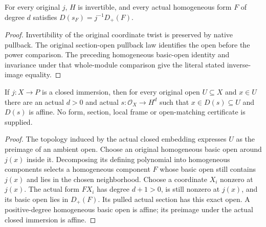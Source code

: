 \begin{lemma}
\label{lem:proj-affine-pulled-section-open}
\leanok
For every original $j$, $H$ is invertible, and every actual homogeneous
form $F$ of degree $d$ satisfies $D(s_F)=j^{-1}D_+(F)$.
\end{lemma}
\begin{proof}
Invertibility of the original coordinate twist is preserved by native
pullback. The original section-open pullback law identifies the open
before the power comparison. The preceding homogeneous basic-open
identity and invariance under that whole-module comparison give the
literal stated inverse-image equality.
\end{proof}

\begin{lemma}
\label{lem:proj-affine-positive-section-neighborhood}
\leanok
If $j:X\to P$ is a closed immersion, then for every original open
$U\subseteq X$ and $x\in U$ there are an actual $d>0$ and actual
$s:\mathcal O_X\to H^d$ such that $x\in D(s)\subseteq U$ and
$D(s)$ is affine. No form, section, local frame or open-matching
certificate is supplied.
\end{lemma}
\begin{proof}
The topology induced by the actual closed embedding expresses $U$ as
the preimage of an ambient open. Choose an original homogeneous basic
open around $j(x)$ inside it. Decomposing its defining polynomial
into homogeneous components selects a homogeneous component $F$ whose
basic open still contains $j(x)$ and lies in the chosen neighborhood.
Choose a coordinate $X_i$ nonzero at $j(x)$. The actual form $FX_i$
has degree $d+1>0$, is still nonzero at $j(x)$, and its basic open
lies in $D_+(F)$. Its pulled actual section has this exact open.
A positive-degree homogeneous basic open is affine; its preimage
under the actual closed immersion is affine.
\end{proof}


